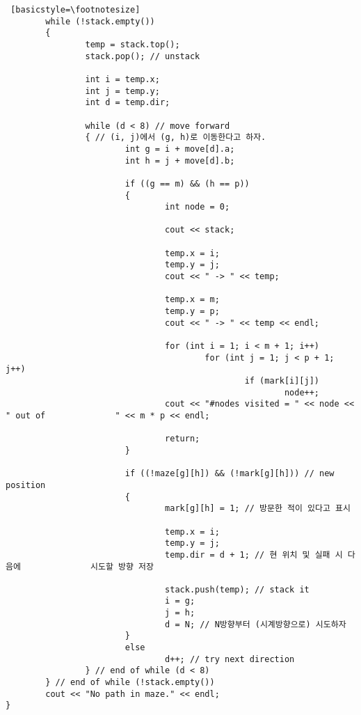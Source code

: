 \documentclass[twoside,twocolumn]{article}
\begin{document}
\begin{lstlisting} [basicstyle=\footnotesize]
        while (!stack.empty())
        {
                temp = stack.top();
                stack.pop(); // unstack

                int i = temp.x;
                int j = temp.y;
                int d = temp.dir;

                while (d < 8) // move forward
                { // (i, j)에서 (g, h)로 이동한다고 하자.
                        int g = i + move[d].a;
                        int h = j + move[d].b;

                        if ((g == m) && (h == p))
                        {
                                int node = 0;

                                cout << stack;

                                temp.x = i;
                                temp.y = j;
                                cout << " -> " << temp;

                                temp.x = m;
                                temp.y = p;
                                cout << " -> " << temp << endl;

                                for (int i = 1; i < m + 1; i++)
                                        for (int j = 1; j < p + 1; j++)
                                                if (mark[i][j])
                                                        node++;
                                cout << "#nodes visited = " << node << " out of              " << m * p << endl;

                                return;
                        }

                        if ((!maze[g][h]) && (!mark[g][h])) // new position
                        {
                                mark[g][h] = 1; // 방문한 적이 있다고 표시

                                temp.x = i;
                                temp.y = j;
                                temp.dir = d + 1; // 현 위치 및 실패 시 다음에              시도할 방향 저장

                                stack.push(temp); // stack it
                                i = g;
                                j = h;
                                d = N; // N방향부터 (시계방향으로) 시도하자
                        }
                        else
                                d++; // try next direction
                } // end of while (d < 8)
        } // end of while (!stack.empty())
        cout << "No path in maze." << endl;
}


\end{lstlisting}
\end{document}
